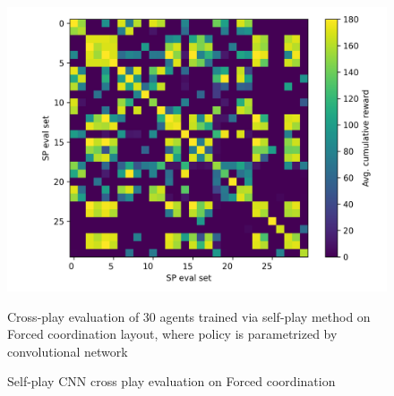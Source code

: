 \begin{figure}[!ht]
  \centering
  \includegraphics*[width=14cm]{../img/Forced_coordination_CNN_SP_CrossPlay(5).png}
  \caption{Self-play CNN cross play evaluation on Forced coordination}
  \label{ForcedCoordinationCNNSPCrossPlay}
  \medskip
  \small 
  Cross-play evaluation of 30 agents trained via self-play method on Forced coordination layout, where policy is parametrized by convolutional network

\end{figure}